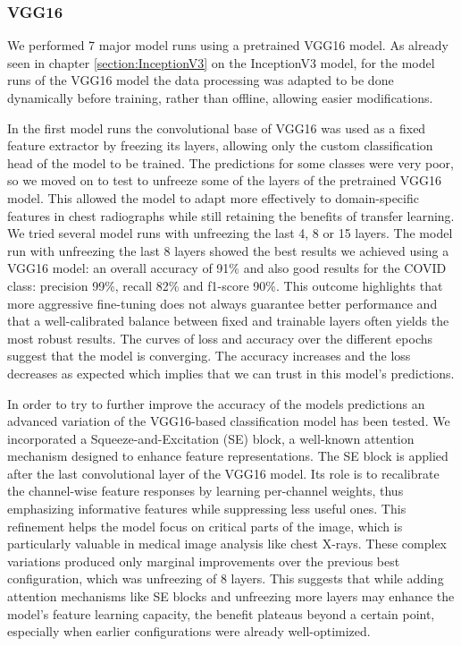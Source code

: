 \documentclass{article}
\begin{document}

\subsubsection {VGG16} \label{section:VGG16}
We performed 7 major model runs using a pretrained VGG16 model. As already seen in chapter \ref{section:InceptionV3} on the InceptionV3 model, for the model runs of the VGG16 model the data processing was adapted to be done dynamically before training, rather than offline, allowing easier modifications.

In the first model runs the convolutional base of VGG16 was used as a fixed feature extractor by freezing its layers, allowing only the custom classification head of the model to be trained. The predictions for some classes were very poor, so we moved on to test to unfreeze some of the layers of the pretrained VGG16 model. This allowed the model to adapt more effectively to domain-specific features in chest radiographs while still retaining the benefits of transfer learning. We tried several model runs with unfreezing the last 4, 8 or 15 layers. The model run with unfreezing the last 8 layers showed the best results we achieved using a VGG16 model: an overall accuracy of 91\% and also good results for the COVID class: precision 99\%, recall 82\% and f1-score 90\%. This outcome highlights that more aggressive fine-tuning does not always guarantee better performance and that a well-calibrated balance between fixed and trainable layers often yields the most robust results. The curves of loss and accuracy over the different epochs suggest that the model is converging. The accuracy increases and the loss decreases as expected which implies that we can trust in this model's predictions.

In order to try to further improve the accuracy of the models predictions an advanced variation of the VGG16-based classification model has been tested. We incorporated a Squeeze-and-Excitation (SE) block, a well-known attention mechanism designed to enhance feature representations. The SE block is applied after the last convolutional layer of the VGG16 model. Its role is to recalibrate the channel-wise feature responses by learning per-channel weights, thus emphasizing informative features while suppressing less useful ones. This refinement helps the model focus on critical parts of the image, which is particularly valuable in medical image analysis like chest X-rays. These complex variations produced only marginal improvements over the previous best configuration, which was unfreezing of 8 layers. This suggests that while adding attention mechanisms like SE blocks and unfreezing more layers may enhance the model’s feature learning capacity, the benefit plateaus beyond a certain point, especially when earlier configurations were already well-optimized. 
\end{document}
